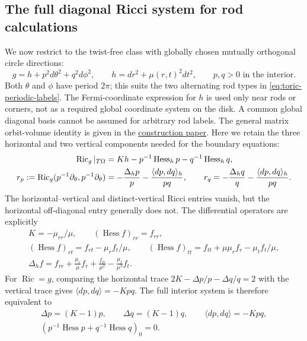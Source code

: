 \documentclass[a4paper,11pt]{article}
\numberwithin{equation}{section}
\theoremstyle{definition}
\newcommand{\Ric}{\operatorname{Ric}}
\begin{document}
\subsection{The full diagonal Ricci system for rod calculations}
We now restrict to the twist-free class with globally chosen mutually orthogonal circle directions:
\begin{equation}\label{eq:toric-diagonal-metric}
 g=h+p^2d\theta^2+q^2d\phi^2,\qquad
 h=dr^2+\mu(r,t)^2dt^2,\qquad p,q>0\text{ in the interior}.
\end{equation}
Both $\theta$ and $\phi$ have period $2\pi$; this suits the two alternating rod types in \eqref{eq:toric-periodic-labels}.
The Fermi-coordinate expression for $h$ is used only near rods or corners, not as a required global coordinate system on the disk.
A common global diagonal basis cannot be assumed for arbitrary rod labels.
The general matrix orbit-volume identity is given in the \href{20260916_construction.tex}{construction paper}.
Here we retain the three horizontal and two vertical components needed for the boundary equations:
\begin{align}
 \Ric_g|_{T\Omega}&=Kh-p^{-1}\operatorname{Hess}_h p-q^{-1}\operatorname{Hess}_h q,
 \notag\\
 r_p:=\Ric_g(p^{-1}\partial_\theta,p^{-1}\partial_\theta)
 &=-\frac{\Delta_h p}{p}-\frac{\langle dp,dq\rangle_h}{pq},\qquad
 r_q=-\frac{\Delta_h q}{q}-\frac{\langle dp,dq\rangle_h}{pq}.
 \label{eq:toric-diagonal-Ricci}
\end{align}
The horizontal--vertical and distinct-vertical Ricci entries vanish, but the horizontal off-diagonal entry generally does not.
The differential operators are explicitly
\begin{equation}\label{eq:toric-Fermi-operators}
 \begin{gathered}
 K=-\mu_{rr}/\mu,\qquad (\operatorname{Hess} f)_{rr}=f_{rr},\\
 (\operatorname{Hess} f)_{rt}=f_{rt}-\mu_r f_t/\mu,\qquad
 (\operatorname{Hess} f)_{tt}=f_{tt}+\mu\mu_r f_r-\mu_t f_t/\mu,\\
 \Delta_h f=f_{rr}+\frac{\mu_r}{\mu}f_r+\frac{f_{tt}}{\mu^2}
             -\frac{\mu_t}{\mu^3}f_t.
 \end{gathered}
\end{equation}
For $\Ric=g$, comparing the horizontal trace $2K-\Delta p/p-\Delta q/q=2$ with the vertical trace gives $\langle dp,dq\rangle=-Kpq$.
The full interior system is therefore equivalent to
\begin{equation}\label{eq:toric-corrected-system}
 \begin{gathered}
 \Delta p=(K-1)p,\qquad \Delta q=(K-1)q,\qquad
 \langle dp,dq\rangle=-Kpq,\\
 \left(p^{-1}\operatorname{Hess}p+q^{-1}\operatorname{Hess}q\right)_0=0.
 \end{gathered}
\end{equation}
\end{document}
